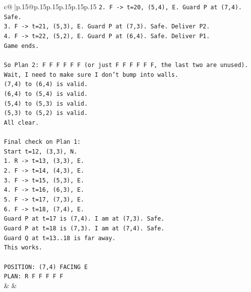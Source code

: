 \documentclass{article}
\begin{document}
{\begin{supertabular}{c@{$\;$}|p{.15\linewidth}@{}p{.15\linewidth}p{.15\linewidth}p{.15\linewidth}p{.15\linewidth}p{.15\linewidth}}
{{{\texttt{2. F {-}> t=20, (5,4), E. Guard P at (7,4). Safe.} \\
\texttt{3. F {-}> t=21, (5,3), E. Guard P at (7,3). Safe. Deliver P2.} \\
\texttt{4. F {-}> t=22, (5,2), E. Guard P at (6,4). Safe. Deliver P1.} \\
\texttt{Game ends.} \\
\\ 
\texttt{So Plan 2: F F F F F F (or just F F F F F F, the last two are unused).} \\
\texttt{Wait, I need to make sure I don't bump into walls.} \\
\texttt{(7,4) to (6,4) is valid.} \\
\texttt{(6,4) to (5,4) is valid.} \\
\texttt{(5,4) to (5,3) is valid.} \\
\texttt{(5,3) to (5,2) is valid.} \\
\texttt{All clear.} \\
\\ 
\texttt{Final check on Plan 1:} \\
\texttt{Start t=12, (3,3), N.} \\
\texttt{1. R {-}> t=13, (3,3), E.} \\
\texttt{2. F {-}> t=14, (4,3), E.} \\
\texttt{3. F {-}> t=15, (5,3), E.} \\
\texttt{4. F {-}> t=16, (6,3), E.} \\
\texttt{5. F {-}> t=17, (7,3), E.} \\
\texttt{6. F {-}> t=18, (7,4), E.} \\
\texttt{Guard P at t=17 is (7,4). I am at (7,3). Safe.} \\
\texttt{Guard P at t=18 is (7,3). I am at (7,4). Safe.} \\
\texttt{Guard Q at t=13..18 is far away.} \\
\texttt{This works.} \\
\\ 
\texttt{POSITION: (7,4) FACING E} \\
\texttt{PLAN: R F F F F F} \\
            }
        }
    }
    & & \\ \\


\end{supertabular}}
\end{document}

